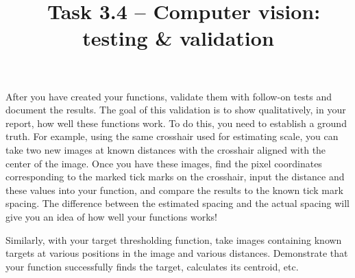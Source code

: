 \documentclass{tufte-handout}
\title{\usnaCourseNumber\ Task 3.4 -- Computer vision: testing \& validation}
\author{\usnaInstructorShort}
\date{\printdate{\courseWeekTwo}}
\begin{document}
\maketitle

After you have created your functions, validate them with follow-on tests and document the results. The goal of this validation is to show qualitatively, in your report, how well these functions work. To do this, you need to establish a ground truth. For example, using the same crosshair used for estimating scale, you can take two new images at known distances with the crosshair aligned with the center of the image. Once you have these images, find the pixel coordinates corresponding to the marked tick marks on the crosshair, input the distance and these values into your function, and compare the results to the known tick mark spacing. The difference between the estimated spacing and the actual spacing will give you an idea of how well your functions works!

Similarly, with your target thresholding function, take images containing known targets at various positions in the image and various distances. Demonstrate that your function successfully finds the target, calculates its centroid, etc. 
\end{document}
